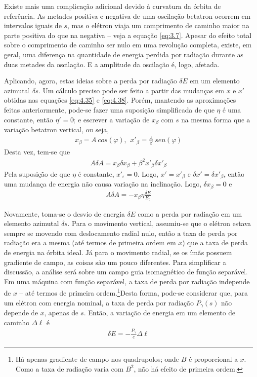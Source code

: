 Existe mais uma complicação adicional devido à curvatura da órbita de referência. As metades positiva e negativa de uma oscilação betatron ocorrem em intervalos iguais de $s$, mas o elétron viaja um comprimento de caminho maior na parte positiva do que na negativa --  veja a equação \eqref{eq:3.7}. Apesar do efeito total sobre o comprimento de caminho ser nulo em uma revolução completa, existe, em geral, uma diferença na quantidade de energia perdida por radiação durante as duas metades da oscilação. E a amplitude da oscilação é, logo, afetada.

Aplicando, agora, estas ideias sobre a perda por radiação $\delta E$ em um elemento azimutal $\delta s$. Um cálculo preciso pode ser feito a partir das mudanças em $x$ e $x'$ obtidas nas equações \eqref{eq:4.35} e \eqref{eq:4.38}. Porém, mantendo as aproximações feitas anteriormente, pode-se fazer uma suposição simplificada de que $\eta$ é uma constante, então $\eta'=0$; e escrever a variação de $x_\beta$ com $s$ na mesma forma que a variação betatron vertical, ou seja,
\begin{align}
	x_\beta = A\ cos(\varphi), \ \ x'_\beta = \frac{A}{\beta}\ sen(\varphi)
\end{align}
Desta vez, tem-se que
\begin{align}
	A \delta A = x_\beta \delta x_\beta + \beta^2 x'_\beta \delta x'_\beta
\end{align}
Pela suposição de que $\eta$ é constante, $x'_\epsilon = 0$. Logo, $x' = x'_\beta$ e $\delta x' = \delta x'_\beta$, então uma mudança de energia não causa variação na inclinação. Logo, $\delta x_\beta = 0$ e
\begin{align}
	A \delta A = -x_\beta \eta \frac{\delta E}{E_0}\label{eq:4.41}
\end{align}

Novamente, toma-se o desvio de energia $\delta E$ como a perda por radiação em um elemento azimutal $\delta s$. Para o movimento vertical, assumiu-se que o elétron estava sempre se movendo com deslocamento radial nulo, então a taxa de perda por radiação era a mesma (até termos de primeira ordem em $x$) que a taxa de perda de energia na órbita ideal. Já para o movimento radial, se os ímãs possuem gradiente de campo, as coisas são um pouco diferentes. Para simplificar a discussão, a análise será sobre um campo guia isomagnético de função separável. Em uma máquina com função separável, a taxa de perda por radiação independe de $x$ -- até termos de primeira ordem.\footnote{Há apenas gradiente de campo nos quadrupolos; onde $B$ é proporcional a $x$. Como a taxa de radiação varia com $B^2$, não há efeito de primeira ordem.}Desta forma, pode-se considerar que, para um elétron com energia nominal, a taxa de perda por radiação $P_\gamma(s)$ não depende de $x$, apenas de $s$. Então, a variação de energia em um elemento de caminho $\Delta \ell$ é
\begin{align}
	\delta E = -\frac{P_\gamma}{c}\Delta \ell
\end{align}

